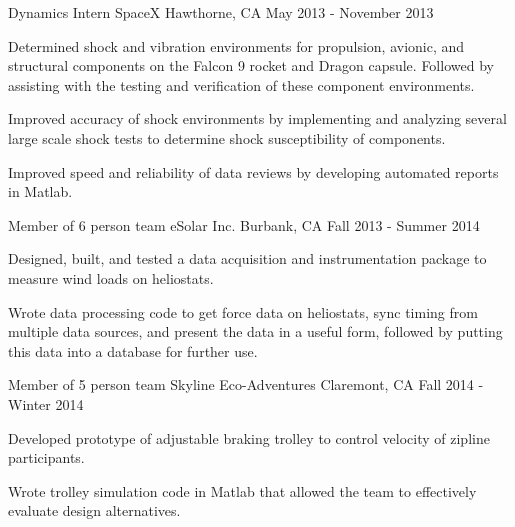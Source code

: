 \begin{cventries}
  \cventry
    {Dynamics Intern} %
    {SpaceX} %
    {Hawthorne, CA} %
    {May 2013 - November 2013} %
    {
      \begin{cvitems} %
        \item {Determined shock and vibration environments for propulsion, avionic, and structural components on the Falcon 9 rocket and Dragon capsule. Followed by assisting with the testing and verification of these component environments.}
        \item {Improved accuracy of shock environments by implementing and analyzing several large scale shock tests to determine shock susceptibility of components.}
        \item {Improved speed and reliability of data reviews by developing automated reports in Matlab.}
      \end{cvitems} 
    }

  \cventry
    {Member of 6 person team} %
    {eSolar Inc.} %
    {Burbank, CA} %
    {Fall 2013 - Summer 2014} %
    {
      \begin{cvitems} %
        \item {Designed, built, and tested a data acquisition and instrumentation package to measure wind loads on heliostats.}
        \item {Wrote data processing code to get force data on heliostats, sync timing from multiple data sources, and present the data in a useful form, followed by putting this data into a database for further use.}
      \end{cvitems}
    }

  \cventry
    {Member of 5 person team} %
    {Skyline Eco-Adventures} %
    {Claremont, CA} %
    {Fall 2014 - Winter 2014} %
    {
      \begin{cvitems} %
        \item {Developed prototype of adjustable braking trolley to control velocity of zipline participants.}
        \item {Wrote trolley simulation code in Matlab that allowed the team to effectively evaluate design alternatives.}
      \end{cvitems}
    }


\end{cventries}
